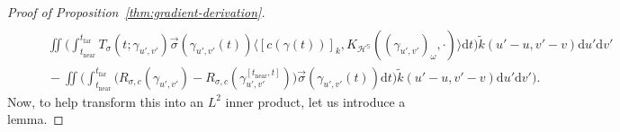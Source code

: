 \documentclass{article}
\newcommand{\dif}{\mathrm{d}}
\newcommand{\render}{{R}}
\newcommand{\near}{\mathrm{near}}
\newcommand{\far}{\mathrm{far}}
\begin{document}
\begin{proof}[Proof of Proposition~\ref{thm:gradient-derivation}]
{\begin{align*}
            \\ &\qquad \iint \biggl(
            \int_{t_\near}^{t_\far}
                T_{\sigma}(t;\gamma_{u',v'}) \vec{\sigma}(\gamma_{u',v'}(t))
                \langle [c(\gamma(t))]_k, K_{\mathcal{H}^\mathbb{S}}((\gamma_{u',v'})_\omega, \cdot) \rangle \dif t \biggr) \widetilde{k}(u'-u,v'-v) \dif u' \dif v'
            \\ &\qquad - \iint \biggl( \int_{t_\near}^{t_\far} \bigl( \render_{\sigma,c}(\gamma_{u',v'}) - \render_{\sigma,c}(\gamma_{u',v'}^{[t_\near, t]})
            \bigr) \vec{\sigma}(\gamma_{u',v'}(t)) \dif t
        \biggr) \widetilde{k}(u'-u,v'-v) \dif u' \dif v' \Biggr).
    \end{align*}
    }
    Now, to help transform this into an $L^2$ inner product, let us introduce a lemma.


\end{proof}
\end{document}
